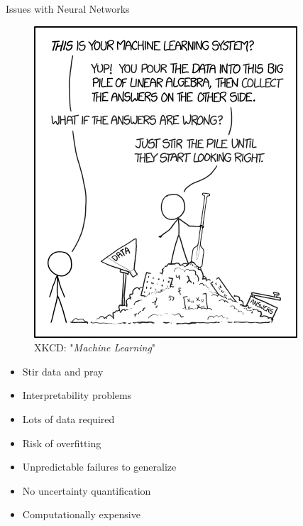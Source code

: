 \documentclass{beamer}
\begin{document}
\begin{frame}{Issues with Neural Networks}
	\begin{multicols}{2}
		\begin{figure}
			\includegraphics[width=.4\textwidth]{../Images/xkcd_machine_learning.png}
			\caption{XKCD: "\textit{Machine Learning}" \cite{xkcd-ml}}
		\end{figure}
		
		\columnbreak
		
		\null \vfill
		\begin{itemize}
			\item Stir data and pray
			\item Interpretability problems
			\item Lots of data required
			\item Risk of overfitting
			\item Unpredictable failures to generalize
			\item No uncertainty quantification
			\item Computationally expensive
		\end{itemize}
		\vfill \null
	\end{multicols}
\end{frame}
\end{document}
